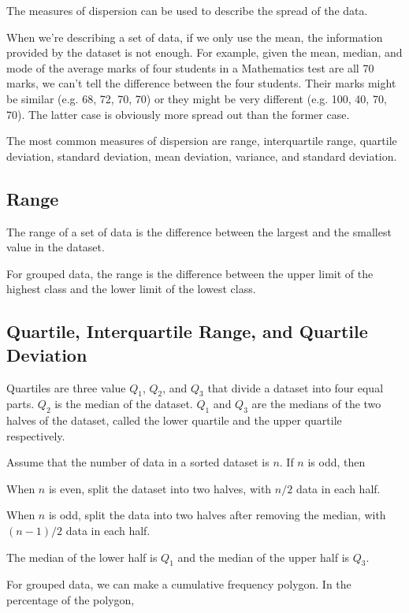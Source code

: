 \documentclass{report}
\begin{document}
\begin{multicols}{2}
  The measures of dispersion can be used to describe the spread of the data.

  When we're describing a set of data, if we only use the mean, the information
  provided by the dataset is not enough. For example, given the mean, median, and
  mode of the average marks of four students in a Mathematics test are all 70
  marks, we can't tell the difference between the four students. Their marks
  might be similar (e.g. 68, 72, 70, 70) or they might be very different (e.g.
  100, 40, 70, 70). The latter case is obviously more spread out than the former
  case.

  The most common measures of dispersion are range, interquartile range, quartile
  deviation, standard deviation, mean deviation, variance, and standard
  deviation.

  \subsection*{Range}

  The range of a set of data is the difference between the largest and the
  smallest value in the dataset.

  For grouped data, the range is the difference between the upper limit of the
  highest class and the lower limit of the lowest class.

  \subsection*{Quartile, Interquartile Range, and Quartile Deviation}

  Quartiles are three value $Q_1$, $Q_2$, and $Q_3$ that divide a dataset into
  four equal parts. $Q_2$ is the median of the dataset. $Q_1$ and $Q_3$ are the
  medians of the two halves of the dataset, called the lower quartile and the
  upper quartile respectively.

  Assume that the number of data in a sorted dataset is $n$. If $n$ is odd, then

  When $n$ is even, split the dataset into two halves, with $n/2$ data in each
  half.

  When $n$ is odd, split the data into two halves after removing the median, with
  $(n-1)/2$ data in each half.

  The median of the lower half is $Q_1$ and the median of the upper half is
  $Q_3$.

  For grouped data, we can make a cumulative frequency polygon. In the percentage
  of the polygon,


\end{multicols}
\end{document}
